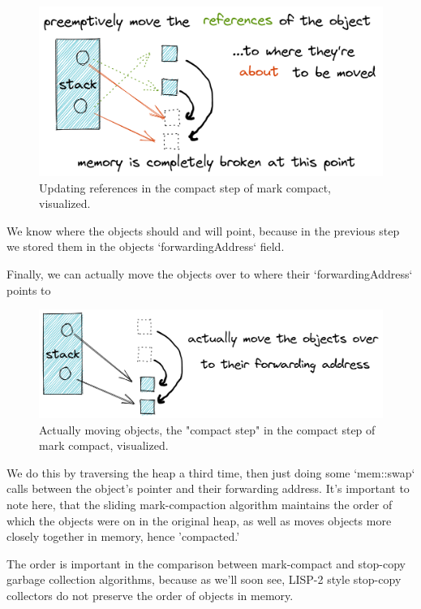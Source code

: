 \documentclass[index]{subfiles}
\begin{document}
\begin{figure}[H]
    \centering
    \includegraphics[scale=0.3]{pics/update-references.png}
    \caption{Updating references in the compact step of mark compact, visualized.}
\end{figure}

We know where the objects should and will point, because in the previous step we stored them in the objects `forwardingAddress` field.

Finally, we can actually move the objects over to where their `forwardingAddress` points to

\begin{figure}[H]
    \centering
    \includegraphics[scale=0.3]{pics/actually-move.png}
    \caption{Actually moving objects, the "compact step" in the compact step of mark compact, visualized.}
\end{figure}

We do this by traversing the heap a third time, then just doing some `mem::swap` calls between the object's pointer and their forwarding address. It's important to note here, that the sliding mark-compaction algorithm maintains the order of which the objects were on in the original heap, as well as moves objects more closely together in memory, hence 'compacted.'

The order is important in the comparison between mark-compact and stop-copy garbage collection algorithms, because as we'll soon see, LISP-2 style stop-copy collectors do not preserve the order of objects in memory.
\end{document}
